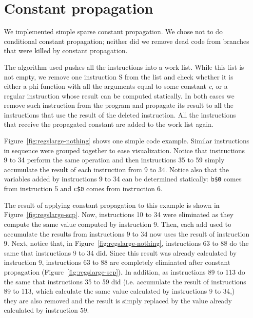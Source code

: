 \documentclass[10pt,twocolumn]{article}
\begin{document}
\section{Constant propagation}

We implemented simple sparse constant propagation. We chose not to do
conditional constant propagation; neither did we remove dead code from
branches that were killed by constant
propagation.

The algorithm used pushes all the instructions into a work list. While
this list is not empty, we remove one instruction S from the list and check
whether it is either a phi function with all the arguments equal to
some constant \emph{c}, or a regular instruction whose result can be computed
statically. In both cases we remove such instruction from the program and
propagate its result to all the instructions that use the result of the deleted
instruction. All the instructions that receive the propagated constant are
added to the work list again.

Figure~\ref{fig:regslarge-nothing} shows one simple code example. Similar instructions
in sequence were grouped together to ease visualization. Notice that
instructions 9 to 34 perform the same operation and then instructions 35 to 59 simply
accumulate the result of each instruction from 9 to 34. Notice also that the variables
added by instructions 9 to 34 can be determined statically: \texttt{b\$0} comes from
instruction 5 and \texttt{c\$0} comes from instruction 6.

The result of applying constant propagation to this example is shown in Figure~\ref{fig:regslarge-scp}.
Now, instructions 10 to 34 were eliminated as they compute the same value computed by instruction 9.
Then, each add used to accumulate the results from instructions 9 to 34 now uses the result of instruction 9.
Next, notice that, in Figure~\ref{fig:regslarge-nothing}, instructions 63 to 88 do the same
that instructions 9 to 34 did. Since this result was already calculated by instruction 9, instructions 63 to 88
are completely eliminated after constant propagation (Figure~\ref{fig:regslarge-scp}). In addition, as instructions
89 to 113 do the same that instructions 35 to 59 did (i.e. accumulate the result of instructions 89 to 113, which calculate the same value calculated
by instructions 9 to 34,) they are also removed and the result is simply replaced by the value already
calculated by instruction 59.
\end{document}
